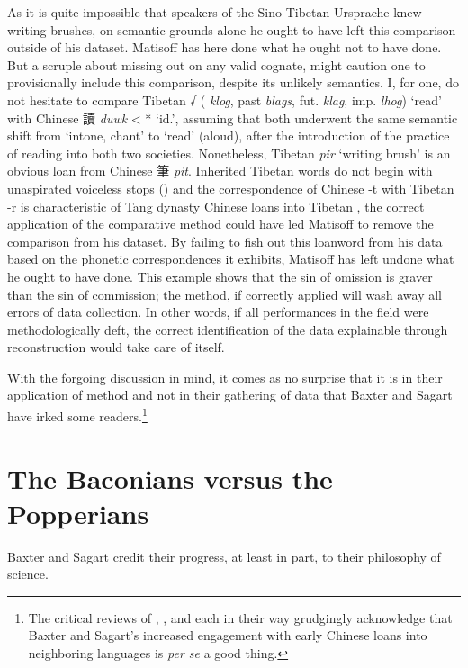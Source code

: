 As it is quite impossible that speakers of the Sino-Tibetan Ursprache knew writing brushes, on semantic grounds alone he ought to have left this  comparison outside of his dataset. Matisoff has here done what he ought not to have done. But a scruple about missing out on any valid cognate, might caution one to provisionally include this  comparison, despite its unlikely semantics. I, for one, do not hesitate to compare Tibetan 
√{} 
({} \textit{klog}, past {} \textit{blags}, fut. {} \textit{klag}, imp. {} \textit{lhog}) `read' with Chinese 讀 \textit{duwk}
< *{} `id.', assuming that both underwent the same semantic shift from `intone, chant' to `read' (aloud), after the introduction of the practice of reading into both two societies. 
Nonetheless, 
Tibetan 
{}
\textit{pir} `writing brush' is an obvious loan from Chinese 筆 \textit{pit}. 
Inherited Tibetan words do not begin with unaspirated voiceless stops (\cite{hill07aspirate}) and the correspondence of Chinese -t with Tibetan -r is characteristic of Tang dynasty Chinese loans into Tibetan \citep{Preiswerk2014Alttibetischen}, the correct application of the comparative method could have led Matisoff to remove the comparison from his dataset. By failing to fish out this loanword from his data based on the phonetic correspondences it exhibits, Matisoff has left undone what he ought to have done. This example shows that the sin of omission is graver than the sin of commission; the method, if correctly applied will wash away all errors of data collection.  
In other words, if all performances in the field were methodologically deft, the correct identification of the data explainable through reconstruction would take care of itself.

With the forgoing discussion in mind, it comes as no surprise that it is in their application of method and not in their gathering of data that Baxter and Sagart have irked some readers.\footnote{The critical reviews of \citet{Schuessler2015BSrv}, 
  \citet{Ho2016}, and 
  \citet{Harbsmeier2016} each in their way grudgingly acknowledge that Baxter and Sagart's increased engagement with early Chinese loans into neighboring languages is \textit{per se} a good thing.} 

\section{The Baconians versus the Popperians}
Baxter and Sagart credit their progress, at least in part, to their philosophy of science.  

